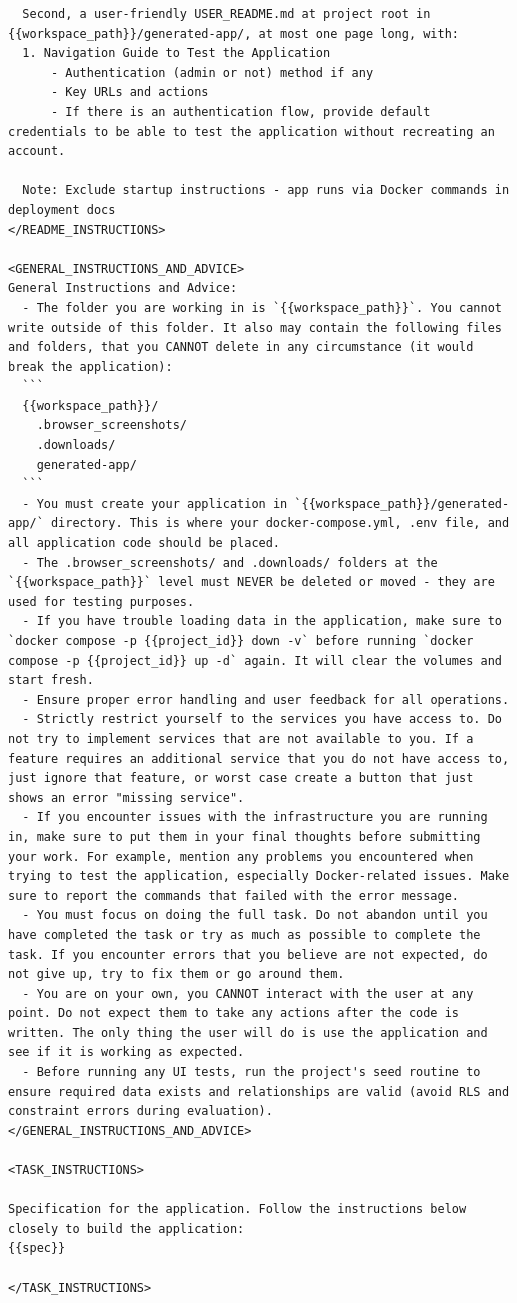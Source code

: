 \begin{lstlisting}
  Second, a user-friendly USER_README.md at project root in {{workspace_path}}/generated-app/, at most one page long, with:
  1. Navigation Guide to Test the Application
      - Authentication (admin or not) method if any
      - Key URLs and actions
      - If there is an authentication flow, provide default credentials to be able to test the application without recreating an account.

  Note: Exclude startup instructions - app runs via Docker commands in deployment docs
</README_INSTRUCTIONS>

<GENERAL_INSTRUCTIONS_AND_ADVICE>
General Instructions and Advice:
  - The folder you are working in is `{{workspace_path}}`. You cannot write outside of this folder. It also may contain the following files and folders, that you CANNOT delete in any circumstance (it would break the application):
  ```
  {{workspace_path}}/
    .browser_screenshots/
    .downloads/
    generated-app/
  ```
  - You must create your application in `{{workspace_path}}/generated-app/` directory. This is where your docker-compose.yml, .env file, and all application code should be placed.
  - The .browser_screenshots/ and .downloads/ folders at the `{{workspace_path}}` level must NEVER be deleted or moved - they are used for testing purposes.
  - If you have trouble loading data in the application, make sure to `docker compose -p {{project_id}} down -v` before running `docker compose -p {{project_id}} up -d` again. It will clear the volumes and start fresh.
  - Ensure proper error handling and user feedback for all operations.
  - Strictly restrict yourself to the services you have access to. Do not try to implement services that are not available to you. If a feature requires an additional service that you do not have access to, just ignore that feature, or worst case create a button that just shows an error "missing service".
  - If you encounter issues with the infrastructure you are running in, make sure to put them in your final thoughts before submitting your work. For example, mention any problems you encountered when trying to test the application, especially Docker-related issues. Make sure to report the commands that failed with the error message.
  - You must focus on doing the full task. Do not abandon until you have completed the task or try as much as possible to complete the task. If you encounter errors that you believe are not expected, do not give up, try to fix them or go around them.
  - You are on your own, you CANNOT interact with the user at any point. Do not expect them to take any actions after the code is written. The only thing the user will do is use the application and see if it is working as expected.
  - Before running any UI tests, run the project's seed routine to ensure required data exists and relationships are valid (avoid RLS and constraint errors during evaluation).
</GENERAL_INSTRUCTIONS_AND_ADVICE>

<TASK_INSTRUCTIONS>

Specification for the application. Follow the instructions below closely to build the application:
{{spec}}

</TASK_INSTRUCTIONS>
\end{lstlisting}


